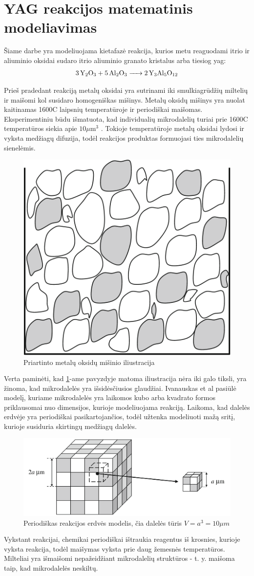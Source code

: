 \section{YAG reakcijos matematinis modeliavimas}

Šiame darbe yra modeliuojama kietafazė reakcija, kurios metu reaguodami itrio ir aliuminio oksidai sudaro itrio aliuminio granato kristalus arba tiesiog \acs{yag}:
\begin{align*}
  \ce{3Y_2O_3 + 5Al_2O_3 -> 2Y_3Al_5O_12}
\end{align*}

Prieš pradedant reakciją metalų oksidai yra sutrinami iki smulkiagrūdžių miltelių ir maišomi kol susidaro homogeniškas mišinys. Metalų oksidų mišinys yra nuolat kaitinamas 1600\degree C laipsnių temperatūroje ir periodiškai maišomas. Eksperimentiniu būdu išmatuota, kad individualių mikrodalelių turiai prie 1600\degree C temperatūros siekia apie $10\mu\text{m}^3$ \cite{ivanauskasComputationalModellingYAG2009}. Tokioje temperatūroje metalų oksidai lydosi ir vyksta medžiagų difuzija, todėl reakcijos produktas formuojasi ties mikrodalelių sienelėmis.

\begin{figure}[h]
  \centering
  \includegraphics[width=0.25\linewidth]{assets/metal_oxides_mixture.png}
  \caption{Priartinto metalų oksidų mišinio iliustracija}
  \label{fig:metal-oxides-mixuter}
\end{figure}

Verta paminėti, kad \ref{fig:metal-oxides-mixuter}-ame pavyzdyje matoma iliustracija nėra iki galo tiksli, yra žinoma, kad mikrodalelės yra išsidėsčiusios glaudžiai.
\cite{ivanauskasModellingSolidState2005} Ivanauskas et al pasiūlė modelį, kuriame mikrodalelės yra laikomos kubo arba kvadrato formos priklausomai nuo dimensijos, kurioje modeliuojama reakciją. Laikoma, kad dalelės erdvėje yra periodiškai pasikartojančios, todėl užtenka modeliuoti mažą sritį, kurioje susiduria skirtingų medžiagų dalelės. 

\begin{figure}[h]
  \centering
  \includegraphics[width=0.75\linewidth]{assets/periodic-space.png}
  \caption{Periodiškas reakcijos erdvės modelis, čia dalelės tūris $V=a^3=10\mu m$}
  \label{fig:periodic-space}
\end{figure}

Vykstant reakcijai, chemikai periodiškai ištraukia reagentus iš krosnies, kurioje vyksta reakcija, todėl maišymas vyksta prie daug žemesnės temperatūros. Milteliai yra išmaišomi nepažeidžiant mikrodalelių struktūros - t. y. maišoma taip, kad mikrodalelės neskiltų.